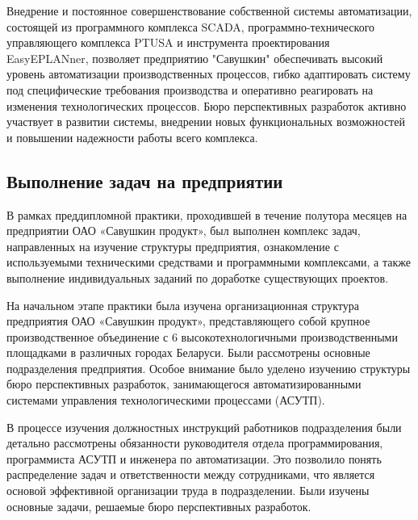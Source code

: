 {	\par \redline Внедрение и постоянное совершенствование собственной системы автоматизации, состоящей из программного комплекса SCADA, программно-технического управляющего комплекса PTUSA и инструмента проектирования EasyEPLANner, позволяет предприятию "Савушкин" обеспечивать высокий уровень автоматизации производственных процессов, гибко адаптировать систему под специфические требования производства и оперативно реагировать на изменения технологических процессов. Бюро перспективных разработок активно участвует в развитии системы, внедрении новых функциональных возможностей и повышении надежности работы всего комплекса.
	
	\subtitlespace
	
	\subsection*{
		\gostTitleFont
		 Выполнение задач на предприятии
	} 
	
	\subtitlespace
	
	{\gostFont
		
		\par \redline В рамках преддипломной практики, проходившей в течение полутора месяцев на предприятии ОАО «Савушкин продукт», был выполнен комплекс задач, направленных на изучение структуры предприятия, ознакомление с используемыми техническими средствами и программными комплексами, а также выполнение индивидуальных заданий по доработке существующих проектов.
		
		\par \redline На начальном этапе практики была изучена организационная структура предприятия ОАО «Савушкин продукт», представляющего собой крупное производственное объединение с 6 высокотехнологичными производственными площадками в различных городах Беларуси. Были рассмотрены основные подразделения предприятия. Особое внимание было уделено изучению структуры бюро перспективных разработок, занимающегося автоматизированными системами управления технологическими процессами (АСУТП).
		
		\par \redline В процессе изучения должностных инструкций работников подразделения были детально рассмотрены обязанности руководителя отдела программирования, программиста АСУТП и инженера по автоматизации. Это позволило понять распределение задач и ответственности между сотрудниками, что является основой эффективной организации труда в подразделении. Были изучены основные задачи, решаемые бюро перспективных разработок.
		
}}
